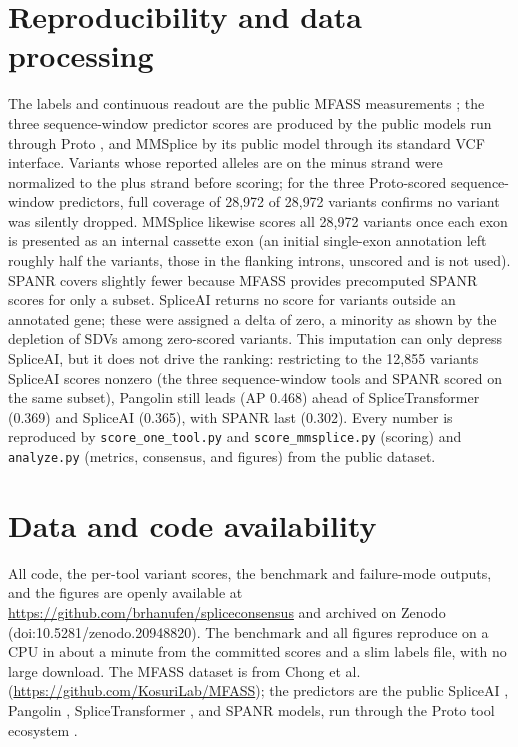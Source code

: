 \documentclass[11pt]{article}
\let\oldsection\section
\renewcommand{\section}{\Needspace*{7\baselineskip}\oldsection}
\begin{document}
\section{Reproducibility and data processing}
The labels and continuous readout are the public MFASS measurements \cite{mfass};
the three sequence-window predictor scores are produced by the public models run through Proto
\cite{proto}, and MMSplice by its public model through its standard VCF interface.
Variants whose reported alleles are on the minus strand were normalized to
the plus strand before scoring; for the three Proto-scored sequence-window predictors, full
coverage of 28{,}972 of 28{,}972 variants confirms no variant was silently dropped.
MMSplice likewise scores all 28{,}972 variants once each exon is presented as an
internal cassette exon (an initial single-exon annotation left roughly half the
variants, those in the flanking introns, unscored and is not used).
SPANR covers slightly fewer because MFASS provides precomputed SPANR scores for
only a subset. SpliceAI returns no score for variants outside an
annotated gene; these were assigned a delta of zero, a minority as shown by the
depletion of SDVs among zero-scored variants. This imputation can only depress
SpliceAI, but it does not drive the ranking: restricting to the 12{,}855 variants
SpliceAI scores nonzero (the three sequence-window tools and SPANR scored on the same
subset), Pangolin still
leads (AP 0.468) ahead of SpliceTransformer (0.369) and SpliceAI (0.365), with
SPANR last (0.302). Every number is reproduced by
\texttt{score\_one\_tool.py} and \texttt{score\_mmsplice.py} (scoring) and
\texttt{analyze.py} (metrics, consensus, and figures) from the public dataset.

\section{Data and code availability}
All code, the per-tool variant scores, the benchmark and failure-mode outputs, and
the figures are openly available at \url{https://github.com/brhanufen/spliceconsensus}
and archived on Zenodo (doi:10.5281/zenodo.20948820). The benchmark and all figures reproduce on
a CPU in about a minute from the committed scores and a slim labels file, with no large
download. The MFASS dataset is from Chong et al. \cite{mfass}
(\url{https://github.com/KosuriLab/MFASS}); the predictors are the public SpliceAI
\cite{spliceai}, Pangolin \cite{pangolin}, SpliceTransformer \cite{splicetransformer},
and SPANR \cite{spanr} models, run through the Proto tool ecosystem \cite{proto}.
\end{document}
